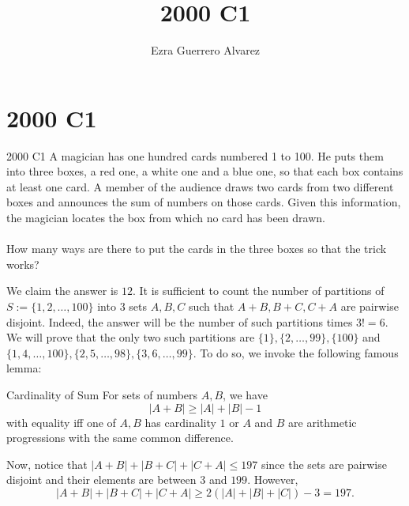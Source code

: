 \documentclass[14pt]{article}
\title{2000 C1}
\author{Ezra Guerrero Alvarez}
\begin{document}
\maketitle
	
\section*{2000 C1}

\begin{statement}{2000 C1}
	A magician has one hundred cards numbered 1 to 100. He puts them into three boxes, a red one, a white one and a blue one, so that each box contains at least one card. A member of the audience draws two cards from two different boxes and announces the sum of numbers on those cards. Given this information, the magician locates the box from which no card has been drawn. \\\\
	How many ways are there to put the cards in the three boxes so that the trick works?
\end{statement}
We claim the answer is $12$. It is sufficient to count the number of partitions of $S:=\{1,2,\ldots,100\}$ into $3$ sets $A,B,C$ such that $A+B,B+C,C+A$ are pairwise disjoint. Indeed, the answer will be the number of such partitions times $3!=6$. We will prove that the only two such partitions are $\{1\},\{2,\ldots,99\},\{100\}$ and $\{1,4,\ldots,100\},\{2,5,\ldots,98\},\{3,6,\ldots,99\}$. To do so, we invoke the following famous lemma:
\begin{lemma}{Cardinality of Sum}
	For sets of numbers $A,B$, we have
	\[ |A+B|\ge|A|+|B|-1 \]
	with equality iff one of $A,B$ has cardinality $1$ or $A$ and $B$ are arithmetic progressions with the same common difference.
\end{lemma}
Now, notice that $|A+B|+|B+C|+|C+A|\le197$ since the sets are pairwise disjoint and their elements are between $3$ and $199$. However,
\[ |A+B|+|B+C|+|C+A|\ge2(|A|+|B|+|C|)-3=197. \]
\end{document}
